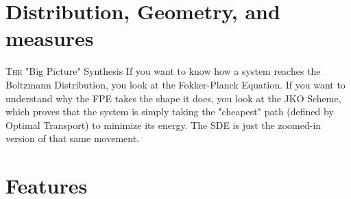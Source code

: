 \documentclass[11pt]{article}
\begin{document}
\section*{Distribution, Geometry, and measures}

\lettrine[lines=3,lraise=0.12]{T}{he} "Big Picture" Synthesis
If you want to know how a system reaches the Boltzmann Distribution, you look at the Fokker-Planck Equation. If you want to understand why the FPE takes the shape it does, you look at the JKO Scheme, which proves that the system is simply taking the "cheapest" path (defined by Optimal Transport) to minimize its energy. The SDE is just the zoomed-in version of that same movement.





\section*{Features}


\end{document}
